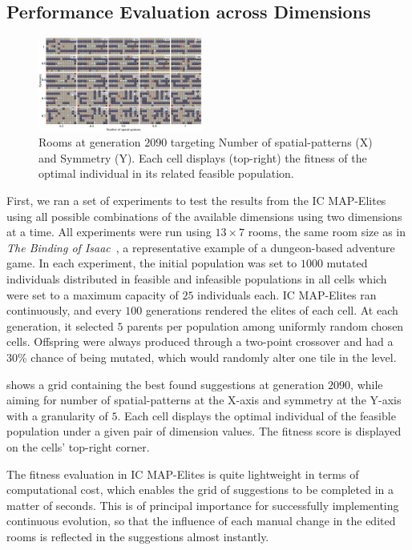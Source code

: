 \subsection{Performance Evaluation across Dimensions}

\begin{figure}[h]
\centerline{\includegraphics[width=0.48\textwidth]{figures/figure3.png}}
\caption{Rooms at generation $2090$ targeting Number of spatial-patterns (X) and Symmetry (Y). Each cell displays (top-right) the fitness of the optimal individual in its related feasible population. }
\label{figs:patt_sym}
\end{figure}

First, we ran a set of experiments to test the results from the IC MAP-Elites using all possible combinations of the available dimensions using two dimensions at a time. All experiments were run using $13\times7$ rooms, the same room size as in \emph{The Binding of Isaac}~\cite{p6mcmillen_binding_2011}, a representative example of a dungeon-based adventure game. In each experiment, the initial population was set to $1000$ mutated individuals distributed in feasible and infeasible populations in all cells which were set to a maximum capacity of $25$ individuals each. IC MAP-Elites ran continuously, and every $100$ generations rendered the elites of each cell. At each generation, it selected $5$ parents per population among uniformly random chosen cells. Offspring were always produced through a two-point crossover and had a 30\% chance of being mutated, which would randomly alter one tile in the level.

 shows a grid containing the best found suggestions at generation $2090$, while aiming for number of spatial-patterns at the X-axis and symmetry at the Y-axis with a granularity of $5$. Each cell displays the optimal individual of the feasible population under a given pair of dimension values. The fitness score is displayed on the cells' top-right corner.

The fitness evaluation in IC MAP-Elites is quite lightweight in terms of computational cost, which enables the grid of suggestions to be completed in a matter of seconds. This is of principal importance for successfully implementing continuous evolution, so that the influence of each manual change in the edited rooms is reflected in the suggestions almost instantly. %

